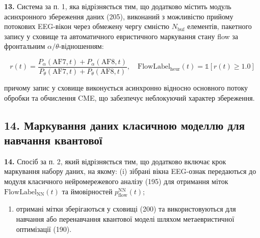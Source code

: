 \documentclass[12pt,a4paper]{article}
\begin{document}
\textbf{13.} Система за п. 1, яка відрізняється тим, що додатково містить модуль асинхронного збереження даних (205), виконаний з можливістю прийому потокових EEG-вікон через обмежену чергу ємністю \(N_{\text{buf}}\) елементів, пакетного запису у сховище та автоматичного евристичного маркування стану flow за фронтальним \(\alpha/\theta\)-відношенням:



\[r(t) = \frac{P_\alpha(\text{AF7}, t) + P_\alpha(\text{AF8}, t)}{P_\theta(\text{AF7}, t) + P_\theta(\text{AF8}, t)}, \quad \text{FlowLabel}_{\text{heur}}(t) = \mathbb{1}[r(t) \geq 1.0]\]



причому запис у сховище виконується асинхронно відносно основного потоку обробки та обчислення CME, що забезпечує неблокуючий характер збереження.



\subsection{14. Маркування даних класичною моделлю для навчання квантової}\label{ux43cux430ux440ux43aux443ux432ux430ux43dux43dux44f-ux434ux430ux43dux438ux445-ux43aux43bux430ux441ux438ux447ux43dux43eux44e-ux43cux43eux434ux435ux43bux43bux44e-ux434ux43bux44f-ux43dux430ux432ux447ux430ux43dux43dux44f-ux43aux432ux430ux43dux442ux43eux432ux43eux457}



\textbf{14.} Спосіб за п. 2, який відрізняється тим, що додатково включає крок маркування набору даних, на якому: (i) зібрані вікна EEG-ознак передаються до модуля класичного нейромережевого аналізу (195) для отримання міток \(\text{FlowLabel}_{\text{NN}}(t)\) та ймовірностей \(p_{\text{flow}}^{\text{NN}}(t)\);



\begin{enumerate}

\def\labelenumi{(\roman{enumi})}

\setcounter{enumi}{1}

\tightlist

\item

  отримані мітки зберігаються у сховищі (200) та використовуються для навчання або перенавчання квантової моделі шляхом метаевристичної оптимізації (190).

\end{enumerate}
\end{document}
